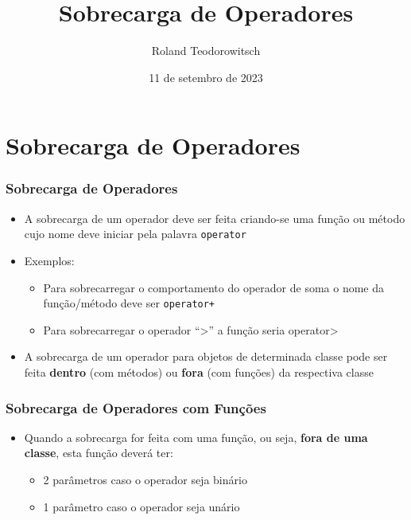 \documentclass[aspectratio=169]{beamer}
\title[\sc{Sobrecarga de Operadores}]{Sobrecarga de Operadores}
\author[Roland Teodorowitsch]{Roland Teodorowitsch}
\institute[POO - EC - PUCRS]{Programação Orientada a Objetos - ECo - Curso de Engenharia de Computação - PUCRS}
\date{11 de setembro de 2023}
\begin{document}
\justifying

\begin{frame}
	\titlepage
\end{frame}

\section{Sobrecarga de Operadores}

\begin{frame}\frametitle{Sobrecarga de Operadores}
\begin{itemize}
	\item A sobrecarga de um operador deve ser feita criando-se uma função ou método cujo nome deve iniciar pela palavra \texttt{operator}
	\item Exemplos:
	\begin{itemize}
		\item Para sobrecarregar o comportamento do operador de soma o nome da função/método deve ser \texttt{operator+}
		\item Para sobrecarregar o operador ``\textgreater'' a função seria operator\textgreater
	\end{itemize}
	\item A sobrecarga de um operador para objetos de determinada classe pode ser feita \textbf{dentro} (com métodos) ou \textbf{fora} (com funções) da respectiva classe
\end{itemize}
\end{frame}

\begin{frame}\frametitle{Sobrecarga de Operadores com Funções}
\begin{itemize}
	\item Quando a sobrecarga for feita com uma função, ou seja, \textbf{fora de uma classe}, esta função deverá ter:
	\begin{itemize}
		\item 2 parâmetros caso o operador seja binário
		\item 1 parâmetro caso o operador seja unário
	\end{itemize}
\end{itemize}
\end{frame}
\end{document}
